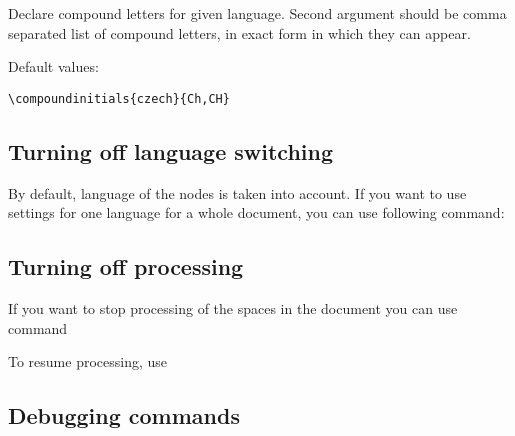 \documentclass[12pt]{ltxdoc}
\newenvironment{mycode}{
	\medskip%
	\parindent=0pt%
}{\medskip}
\begin{document}
\begin{mycode}
\cmd{\compoundinitials}
\end{mycode}

Declare compound letters for given language. Second argument should be comma 
separated list of compound letters, in exact form in which they can appear.

Default values:

\begin{mycode}
\begin{verbatim}
\compoundinitials{czech}{Ch,CH}
\end{verbatim}
\end{mycode}

\subsection{Turning off language switching}

By default, language of the nodes is taken into account. If you want to use
settings for one language for a whole document, you can use following command:

\begin{mycode}
\cmd{\preventsinglelang}
\end{mycode}

\subsection{Turning off processing}

If you want to stop processing of the spaces in the document you can use command

\begin{mycode}
\cmd{\preventsingleoff}
\end{mycode}

To resume processing, use

\begin{mycode}
\cmd{\preventsingleon}
\end{mycode}

\subsection{Debugging commands}
\begin{mycode}
\cmd{\preventsingledebugon}\par
\cmd{\preventsingledebugoff}
\end{mycode}
\end{document}
